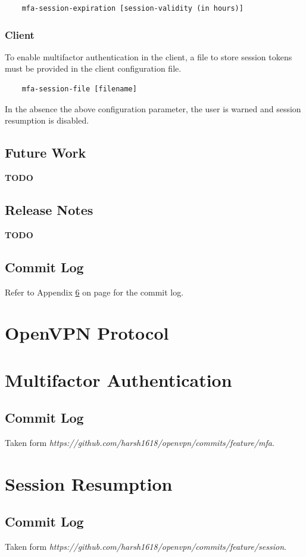 \documentclass[11pt,oneside]{book}
\begin{document}
\begin{verbatim}
    mfa-session-expiration [session-validity (in hours)]
\end{verbatim}

\subsection{Client}
To enable multifactor authentication in the client, a file to store session tokens must be provided
in the client configuration file.

\begin{verbatim}
    mfa-session-file [filename]
\end{verbatim}

\noindent
In the absence the above configuration parameter, the user is warned and session resumption is
disabled.

\section{Future Work}
\textbf{TODO}

\section{Release Notes}
\textbf{TODO}

\section{Commit Log}
Refer to Appendix \ref{Session:Commit} on page \pageref{Session:Commit} for the commit log.

\appendix
\chapter{OpenVPN Protocol}
\label{OpenVPN:Protocol}


\chapter{Multifactor Authentication}
\label{MFA:Commit}
\section{Commit Log}
Taken form \emph{https://github.com/harsh1618/openvpn/commits/feature/mfa}.\\


\chapter{Session Resumption}
\label{Session:Commit}
\section{Commit Log}
Taken form \emph{https://github.com/harsh1618/openvpn/commits/feature/session}.\\





\printindex
{}
\end{document}
